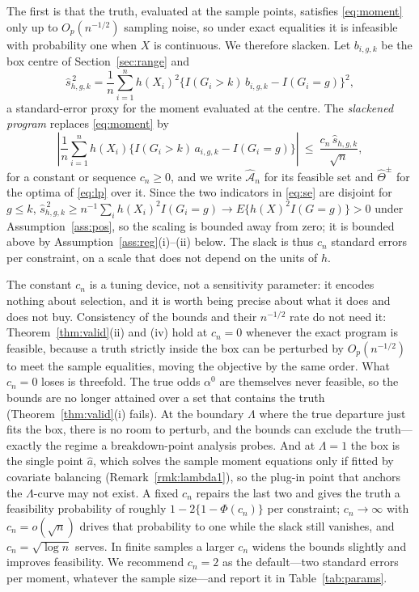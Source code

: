 \documentclass[12pt]{article}
\theoremstyle{remark}
\begin{document}
The first is that the truth, evaluated at the sample points, satisfies \eqref{eq:moment}
only up to $O_p(n^{-1/2})$ sampling noise, so under exact equalities it is infeasible with
probability one when $X$ is continuous. We therefore slacken. Let $b_{i,g,k}$ be the box
centre of Section~\ref{sec:range} and
\begin{equation}
\widehat s^{\,2}_{h,g,k} = \frac{1}{n}\sum_{i=1}^{n} h(X_i)^2
 \big\{ I(G_i{>}k)\, b_{i,g,k} - I(G_i{=}g) \big\}^2,
\label{eq:se}
\end{equation}
a standard-error proxy for the moment evaluated at the centre. The \emph{slackened
program} replaces \eqref{eq:moment} by
\begin{equation}
\left| \frac{1}{n}\sum_{i=1}^{n} h(X_i)\big\{ I(G_i{>}k)\, a_{i,g,k} - I(G_i{=}g)\big\} \right|
\ \le\ \frac{c_n\, \widehat s_{h,g,k}}{\sqrt{n}},
\label{eq:slack}
\end{equation}
for a constant or sequence $c_n \ge 0$, and we write $\widehat{\mathcal{A}}_n$ for its
feasible set and $\widehat\Theta^{\pm}$ for the optima of \eqref{eq:lp} over it. Since
the two indicators in \eqref{eq:se} are disjoint for $g \le k$,
$\widehat s^{\,2}_{h,g,k} \ge n^{-1}\sum_i h(X_i)^2 I(G_i{=}g) \to E\{h(X)^2 I(G{=}g)\} > 0$
under Assumption~\ref{ass:pos}, so the scaling is bounded away from zero; it is bounded
above by Assumption~\ref{ass:reg}(i)--(ii) below. The slack is thus $c_n$ standard errors
per constraint, on a scale that does not depend on the units of $h$.

The constant $c_n$ is a tuning device, not a sensitivity parameter: it encodes nothing
about selection, and it is worth being precise about what it does and does not buy.
Consistency of the bounds and their $n^{-1/2}$ rate do not need it: Theorem~\ref{thm:valid}(ii)
and (iv) hold at $c_n = 0$ whenever the exact program is feasible, because a truth strictly
inside the box can be perturbed by $O_p(n^{-1/2})$ to meet the sample equalities, moving
the objective by the same order. What $c_n = 0$ loses is threefold. The true odds
$\alpha^0$ are themselves never feasible, so the bounds are no longer attained over a set
that contains the truth (Theorem~\ref{thm:valid}(i) fails). At the boundary $\Lambda$ where
the true departure just fits the box, there is no room to perturb, and the bounds can
exclude the truth---exactly the regime a breakdown-point analysis probes. And at
$\Lambda = 1$ the box is the single point $\widehat a$, which solves the sample moment
equations only if fitted by covariate balancing (Remark~\ref{rmk:lambda1}), so the plug-in
point that anchors the $\Lambda$-curve may not exist. A fixed $c_n$ repairs the last two
and gives the truth a feasibility probability of roughly $1 - 2\{1 - \Phi(c_n)\}$ per
constraint; $c_n \to \infty$ with $c_n = o(\sqrt n)$ drives that probability to one while
the slack still vanishes, and $c_n = \sqrt{\log n}$ serves. In finite samples a larger
$c_n$ widens the bounds slightly and improves feasibility. We recommend $c_n = 2$ as the
default---two standard errors per moment, whatever the sample size---and report it in
Table~\ref{tab:params}.
\end{document}

